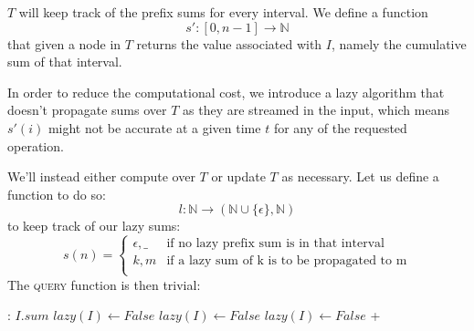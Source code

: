 \documentclass{article}
\begin{document}
$T$ will keep track of the prefix sums for every interval.
We define a function
\begin{equation}
    s': [0, n - 1] \to \mathbb{N}
\end{equation}
that given a node in $T$ returns the value associated with $I$, namely the
cumulative sum of that interval.

In order to reduce the computational cost, we introduce a lazy algorithm
that doesn't propagate sums over $T$ as they are streamed in the input,
which means $s'(i)$ might not be accurate at a given time $t$ for any of the
requested operation.

We'll instead either compute over $T$ or update $T$ as necessary.
Let us define a function to do so:
\begin{equation}
    l: \mathbb{N} \to (\mathbb{N} \cup \{\epsilon\}, \mathbb{N})
\end{equation}
to keep track of our lazy sums:
\begin{equation}
    s(n) = \begin{cases}
            \epsilon, \_            &   \textrm{if no lazy prefix sum is in that interval} \\
            k, m                    &   \textrm{if a lazy sum of k is to be propagated to m}\\
            \end{cases}
\end{equation}
The \textsc{query} function is then trivial:

\begin{algorithmic}[1]
    :
                           
      \State \Return $I.sum$
    \EndIf
         
      \State $lazy(I) \gets False$
      \State {}
    \EndIf
     
      \State $lazy(I) \gets False$
      \State {}
    \EndIf
          
      \State $lazy(I) \gets False$
      \State {} +
    \EndIf
                 
      \State {}
    \EndIf
            
      \State {}
    \EndIf
             
      \State {}
    \EndIf
    \EndFunction
\end{algorithmic}
\end{document}
